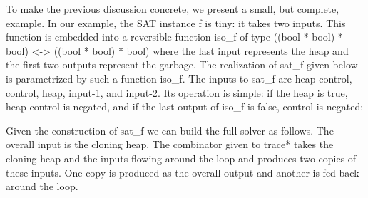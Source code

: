 \documentclass{llncs}
\begin{document}
\begin{center}
\end{center}  

To make the previous discussion concrete, we present a small, but
complete, example. In our example, the SAT instance {{f}} is tiny: it
takes two inputs. This function is embedded into a reversible function
{{iso_f}} of type 
{{((bool * bool) * bool) <-> ((bool * bool) * bool)}} where the last
input represents the heap and the first two outputs represent the garbage. 
The realization of {{sat_f}} given below is parametrized by such 
a function {{iso_f}}. The inputs to {{sat_f}} are 
\textsf{heap control}, \textsf{control}, \textsf{heap}, \textsf{input-1}, and 
\textsf{input-2}. Its operation is simple: if the \textsf{heap} is {{true}}, 
\textsf{heap control} is negated, and if the last output of {{iso_f}} 
is {{false}}, \textsf{control} is negated:


Given the construction of {{sat_f}} we can build the full solver as
follows. The overall input is the cloning heap. The combinator given
to {{trace*}} takes the cloning heap and the inputs flowing around the
loop and produces two copies of these inputs. One copy is produced as
the overall output and another is fed back around the loop. 

\end{document}
